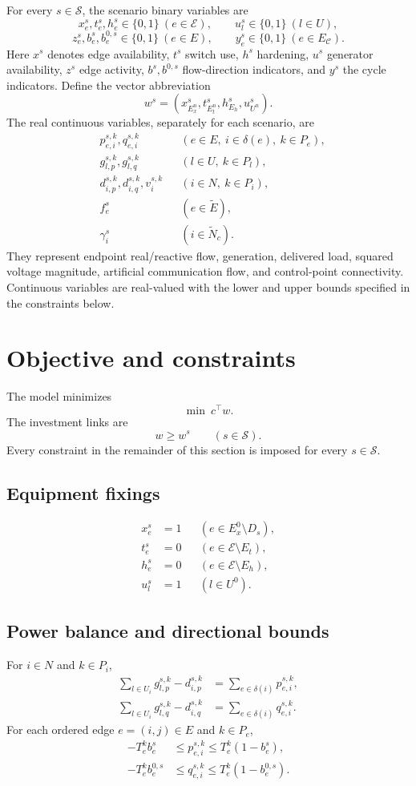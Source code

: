 \documentclass[11pt]{article}
\begin{document}
For every $s\in\mathcal S$, the scenario binary variables are
\[
x_e^s,t_e^s,h_e^s\in\{0,1\}\ (e\in\mathcal E),\qquad
u_l^s\in\{0,1\}\ (l\in U),
\]
\[
z_e^s,b_e^s,b_e^{0,s}\in\{0,1\}\ (e\in E),\qquad
y_e^s\in\{0,1\}\ (e\in E_{\mathcal C}).
\]
Here $x^s$ denotes edge availability, $t^s$ switch use, $h^s$ hardening, $u^s$ generator availability, $z^s$ edge activity, $b^s,b^{0,s}$ flow-direction indicators, and $y^s$ the cycle indicators. Define the vector abbreviation
\[
w^s=(x^s_{E_x^n},t^s_{E_t^n},h^s_{E_h},u^s_{U^n}).
\]
The real continuous variables, separately for each scenario, are
\begin{align*}
&p_{e,i}^{s,k},q_{e,i}^{s,k} &&(e\in E,\ i\in\delta(e),\ k\in P_e),\\
&g_{l,p}^{s,k},g_{l,q}^{s,k} &&(l\in U,\ k\in P_l),\\
&d_{i,p}^{s,k},d_{i,q}^{s,k},v_i^{s,k} &&(i\in N,\ k\in P_i),\\
&f_e^s &&(e\in\widetilde E),\\
&\gamma_i^s &&(i\in\widetilde N_c).
\end{align*}
They represent endpoint real/reactive flow, generation, delivered load, squared voltage magnitude, artificial communication flow, and control-point connectivity. Continuous variables are real-valued with the lower and upper bounds specified in the constraints below.

\section{Objective and constraints}
The model minimizes
\[
\min\ c^\top w.
\]
The investment links are
\[
w\geq w^s\qquad(s\in\mathcal S).
\]
Every constraint in the remainder of this section is imposed for every $s\in\mathcal S$.

\subsection{Equipment fixings}
\begin{align*}
x_e^s&=1 &&(e\in E_x^0\setminus D_s),\\
t_e^s&=0 &&(e\in\mathcal E\setminus E_t),\\
h_e^s&=0 &&(e\in\mathcal E\setminus E_h),\\
u_l^s&=1 &&(l\in U^0).
\end{align*}

\subsection{Power balance and directional bounds}
For $i\in N$ and $k\in P_i$,
\begin{align*}
\sum_{l\in U_i}g_{l,p}^{s,k}-d_{i,p}^{s,k}
 &=\sum_{e\in\delta(i)}p_{e,i}^{s,k},\\
\sum_{l\in U_i}g_{l,q}^{s,k}-d_{i,q}^{s,k}
 &=\sum_{e\in\delta(i)}q_{e,i}^{s,k}.
\end{align*}
For each ordered edge $e=(i,j)\in E$ and $k\in P_e$,
\begin{align*}
-T_e^k b_e^s&\leq p_{e,i}^{s,k}\leq T_e^k(1-b_e^s),\\
-T_e^k b_e^{0,s}&\leq q_{e,i}^{s,k}\leq T_e^k(1-b_e^{0,s}).
\end{align*}
\end{document}
